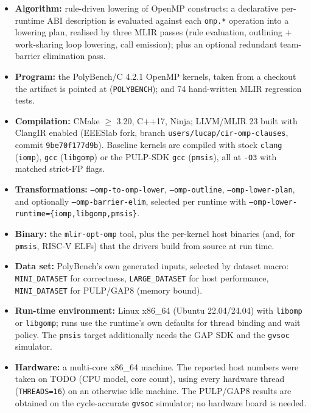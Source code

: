 {\small
\begin{itemize}
  \item {\bf Algorithm: } rule-driven lowering of OpenMP constructs: a
    declarative per-runtime ABI description is evaluated against each
    \texttt{omp.*} operation into a lowering plan, realised by three MLIR
    passes (rule evaluation, outlining + work-sharing loop lowering, call
    emission); plus an optional redundant team-barrier elimination pass.
  \item {\bf Program: } the PolyBench/C 4.2.1 OpenMP kernels, taken from a
    checkout the artifact is pointed at (\texttt{POLYBENCH}); and 74
    hand-written MLIR regression tests.
  \item {\bf Compilation: } CMake $\geq$ 3.20, C++17, Ninja; LLVM/MLIR 23 built
    with ClangIR enabled (EEESlab fork, branch
    \texttt{users/lucap/cir-omp-clauses}, commit \texttt{9be70f177d9b}).
    Baseline kernels are compiled with stock \texttt{clang} (\texttt{iomp}),
    \texttt{gcc} (\texttt{libgomp}) or the PULP-SDK \texttt{gcc}
    (\texttt{pmsis}), all at \texttt{-O3} with matched strict-FP flags.
  \item {\bf Transformations: } \texttt{--omp-to-omp-lower},
    \texttt{--omp-outline}, \texttt{--omp-lower-plan}, and optionally
    \texttt{--omp-barrier-elim}, selected per runtime with
    \texttt{--omp-lower-runtime=\{iomp,libgomp,pmsis\}}.
  \item {\bf Binary: } the \texttt{mlir-opt-omp} tool, plus the per-kernel host
    binaries (and, for \texttt{pmsis}, RISC-V ELFs) that the drivers build from
    source at run time.
  \item {\bf Data set: } PolyBench's own generated inputs, selected by dataset
    macro: \texttt{MINI\_DATASET} for correctness,
    \texttt{LARGE\_DATASET} for host performance, \texttt{MINI\_DATASET} for
    PULP/GAP8 (memory bound).
  \item {\bf Run-time environment: } Linux x86\_64 (Ubuntu 22.04/24.04) with
    \texttt{libomp} or \texttt{libgomp}; runs use
    the runtime's own defaults for thread binding and wait policy.  The
    \texttt{pmsis} target additionally needs the
    GAP SDK and the \texttt{gvsoc} simulator.
  \item {\bf Hardware: } a multi-core x86\_64 machine.  The reported host
    numbers were taken on TODO (CPU model, core count), using every hardware
    thread (\texttt{THREADS=16}) on an otherwise idle machine.  The
    PULP/GAP8 results are obtained on the cycle-accurate \texttt{gvsoc}
    simulator; no hardware board is needed.

\end{itemize}}
